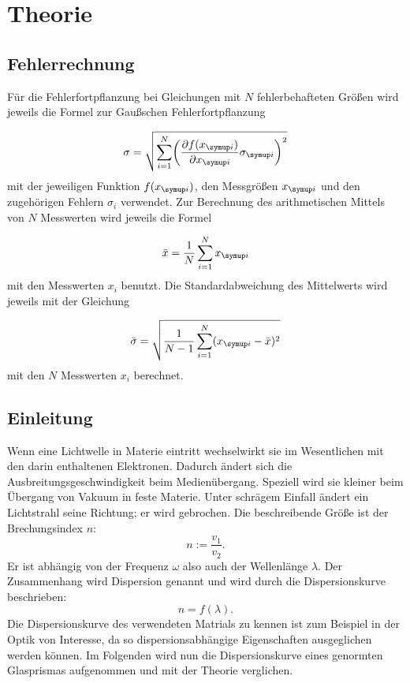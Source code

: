 \section{Theorie}
\label{sec:Theorie}

\subsection{Fehlerrechnung}

Für die Fehlerfortpflanzung bei Gleichungen mit $N$ fehlerbehafteten Größen
wird jeweils die Formel zur Gaußschen Fehlerfortpflanzung

\begin{equation*}
  \sigma = \sqrt{\sum_{i=1}^{N}\biggl(\frac{\partial f(x_{\g{i}})}{\partial x_{\g{i}}}
  \sigma_{\g{i}}\biggr)^2}
\end{equation*}
mit der jeweiligen Funktion $f(x_{\g{i}})$, den Messgrößen $x_{\g{i}}$ und den
zugehörigen Fehlern $\sigma_i$ verwendet.
Zur Berechnung des arithmetischen Mittels von $N$ Messwerten wird jeweils die
Formel

\begin{equation*}
  \bar{x} = \frac{1}{N}\sum_{i=1}^{N}x_{\g{i}}
\end{equation*}
mit den Messwerten $x_i$ benutzt.
Die Standardabweichung des Mittelwerts wird jeweils mit der Gleichung

\begin{equation*}
  \bar{\sigma} = \sqrt{\frac{1}{N-1}\sum_{i=1}^{N}(x_{\g{i}} - \bar{x})^2}
\end{equation*}
mit den $N$ Messwerten $x_i$ berechnet.

\subsection{Einleitung}

Wenn eine Lichtwelle in Materie eintritt wechselwirkt sie im Wesentlichen mit den
darin enthaltenen Elektronen. Dadurch ändert sich die Ausbreitungsgeschwindigkeit
beim Medienübergang. Speziell wird sie kleiner beim Übergang von Vakuum in feste Materie.
Unter schrägem Einfall ändert ein Lichtstrahl seine Richtung; er wird gebrochen.
Die beschreibende Größe ist der Brechungsindex $n$:
\begin{equation}
  n := \frac{v_1}{v_2}.
\end{equation}
Er ist abhängig von der Frequenz $\omega$ also auch der Wellenlänge $\lambda$.
Der Zusammenhang wird Dispersion genannt und wird durch die Dispersionskurve beschrieben:
\begin{equation}
  n = f(\lambda).
\end{equation}
Die Dispersionskurve des verwendeten Matrials zu kennen ist zum Beispiel in der Optik
von Interesse, da so dispersionsabhängige Eigenschaften ausgeglichen werden können.
Im Folgenden wird nun die Dispersionskurve eines genormten Glasprismas aufgenommen und
mit der Theorie verglichen.

